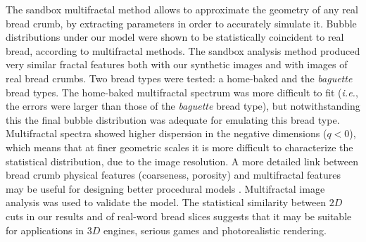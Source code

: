 The sandbox multifractal method allows to approximate the geometry of any real bread crumb, by 
extracting parameters in order to accurately simulate it.
Bubble distributions under our model were shown to be statistically coincident to real bread, according to multifractal methods.
The sandbox analysis method produced very similar fractal features both with our synthetic images and with images of real bread crumbs.
Two bread types were tested: a home-baked and the {\em baguette } bread types.
The home-baked multifractal spectrum was more difficult to fit ({\em i.e.}, the errors were larger than those of the {\em baguette} bread type), but notwithstanding this the final bubble distribution was adequate for emulating this bread type.
Multifractal spectra showed higher dispersion in the negative dimensions ($q < 0$), which means that at finer geometric scales it is more difficult to characterize the statistical distribution, due to the image resolution.
A more detailed link between bread crumb physical features (coarseness, porosity) and multifractal features may be useful for designing better procedural models \cite{Baravalle2012}.
Multifractal image analysis was used to validate the model.
The statistical similarity between $2D$ cuts in our results and of real-word bread slices suggests that it may be suitable for applications in $3D$ engines, serious games \cite{Susi2007} and photorealistic rendering. 



